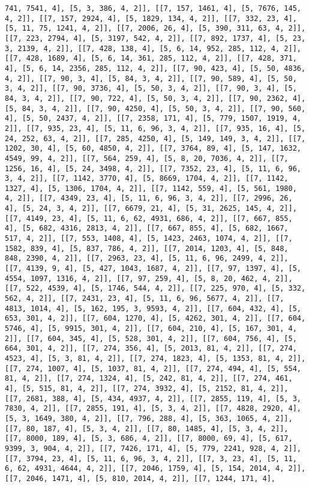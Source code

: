 \documentclass[12pt,fleqn]{article}\usepackage{../../common}
\begin{document}
\begin{verbatim}
741, 7541, 4], [5, 3, 386, 4, 2]], [[7, 157, 1461, 4], [5, 7676, 145, 4, 2]], [[7, 157, 2924, 4], [5, 1829, 134, 4, 2]], [[7, 332, 23, 4], [5, 11, 75, 1241, 4, 2]], [[7, 2006, 26, 4], [5, 390, 311, 63, 4, 2]], [[7, 223, 2794, 4], [5, 3197, 542, 4, 2]], [[7, 892, 1737, 4], [5, 23, 3, 2139, 4, 2]], [[7, 428, 138, 4], [5, 6, 14, 952, 285, 112, 4, 2]], [[7, 428, 1689, 4], [5, 6, 14, 361, 285, 112, 4, 2]], [[7, 428, 371, 4], [5, 6, 14, 2356, 285, 112, 4, 2]], [[7, 90, 423, 4], [5, 50, 4836, 4, 2]], [[7, 90, 3, 4], [5, 84, 3, 4, 2]], [[7, 90, 589, 4], [5, 50, 3, 4, 2]], [[7, 90, 3736, 4], [5, 50, 3, 4, 2]], [[7, 90, 3, 4], [5, 84, 3, 4, 2]], [[7, 90, 722, 4], [5, 50, 3, 4, 2]], [[7, 90, 2362, 4], [5, 84, 3, 4, 2]], [[7, 90, 4250, 4], [5, 50, 3, 4, 2]], [[7, 90, 560, 4], [5, 50, 2437, 4, 2]], [[7, 2358, 171, 4], [5, 779, 1507, 1919, 4, 2]], [[7, 935, 23, 4], [5, 11, 6, 96, 3, 4, 2]], [[7, 935, 16, 4], [5, 24, 252, 63, 4, 2]], [[7, 285, 4250, 4], [5, 149, 149, 3, 4, 2]], [[7, 1202, 30, 4], [5, 60, 4850, 4, 2]], [[7, 3764, 89, 4], [5, 147, 1632, 4549, 99, 4, 2]], [[7, 564, 259, 4], [5, 8, 20, 7036, 4, 2]], [[7, 1256, 16, 4], [5, 24, 3498, 4, 2]], [[7, 7352, 23, 4], [5, 11, 6, 96, 3, 4, 2]], [[7, 1142, 3770, 4], [5, 8669, 1704, 4, 2]], [[7, 1142, 1327, 4], [5, 1306, 1704, 4, 2]], [[7, 1142, 559, 4], [5, 561, 1980, 4, 2]], [[7, 4349, 23, 4], [5, 11, 6, 96, 3, 4, 2]], [[7, 2996, 26, 4], [5, 24, 3, 4, 2]], [[7, 6679, 21, 4], [5, 31, 2625, 145, 4, 2]], [[7, 4149, 23, 4], [5, 11, 6, 62, 4931, 686, 4, 2]], [[7, 667, 855, 4], [5, 682, 4316, 2813, 4, 2]], [[7, 667, 855, 4], [5, 682, 1667, 517, 4, 2]], [[7, 553, 1408, 4], [5, 1423, 2463, 1074, 4, 2]], [[7, 1582, 839, 4], [5, 837, 786, 4, 2]], [[7, 2014, 1203, 4], [5, 848, 848, 2390, 4, 2]], [[7, 2963, 23, 4], [5, 11, 6, 96, 2499, 4, 2]], [[7, 4139, 9, 4], [5, 427, 1043, 1687, 4, 2]], [[7, 97, 1397, 4], [5, 4554, 1097, 1316, 4, 2]], [[7, 97, 259, 4], [5, 8, 20, 462, 4, 2]], [[7, 522, 4539, 4], [5, 1746, 544, 4, 2]], [[7, 225, 970, 4], [5, 332, 562, 4, 2]], [[7, 2431, 23, 4], [5, 11, 6, 96, 5677, 4, 2]], [[7, 4813, 1014, 4], [5, 162, 195, 3, 9593, 4, 2]], [[7, 604, 432, 4], [5, 653, 301, 4, 2]], [[7, 604, 1270, 4], [5, 4262, 301, 4, 2]], [[7, 604, 5746, 4], [5, 9915, 301, 4, 2]], [[7, 604, 210, 4], [5, 167, 301, 4, 2]], [[7, 604, 345, 4], [5, 528, 301, 4, 2]], [[7, 604, 756, 4], [5, 664, 301, 4, 2]], [[7, 274, 356, 4], [5, 2013, 81, 4, 2]], [[7, 274, 4523, 4], [5, 3, 81, 4, 2]], [[7, 274, 1823, 4], [5, 1353, 81, 4, 2]], [[7, 274, 1007, 4], [5, 1037, 81, 4, 2]], [[7, 274, 494, 4], [5, 554, 81, 4, 2]], [[7, 274, 1324, 4], [5, 242, 81, 4, 2]], [[7, 274, 461, 4], [5, 515, 81, 4, 2]], [[7, 274, 3932, 4], [5, 2152, 81, 4, 2]], [[7, 2681, 388, 4], [5, 434, 4937, 4, 2]], [[7, 2855, 119, 4], [5, 3, 7830, 4, 2]], [[7, 2855, 191, 4], [5, 3, 4, 2]], [[7, 4828, 2920, 4], [5, 3, 1649, 380, 4, 2]], [[7, 796, 288, 4], [5, 363, 1065, 4, 2]], [[7, 80, 187, 4], [5, 3, 4, 2]], [[7, 80, 1485, 4], [5, 3, 4, 2]], [[7, 8000, 189, 4], [5, 3, 686, 4, 2]], [[7, 8000, 69, 4], [5, 617, 9399, 3, 904, 4, 2]], [[7, 7426, 171, 4], [5, 779, 2241, 928, 4, 2]], [[7, 3794, 23, 4], [5, 11, 6, 96, 3, 4, 2]], [[7, 3, 23, 4], [5, 11, 6, 62, 4931, 4644, 4, 2]], [[7, 2046, 1759, 4], [5, 154, 2014, 4, 2]], [[7, 2046, 1471, 4], [5, 810, 2014, 4, 2]], [[7, 1244, 171, 4], 
\end{verbatim}
\end{document}
